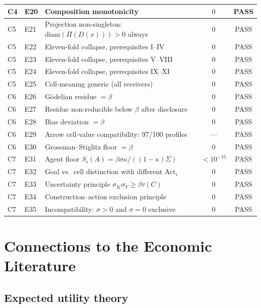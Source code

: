 \documentclass[twocolumn,11pt,a4paper]{article}
\newcommand{\Sfloor}{S_{\flat}}
\newcommand{\diam}{\mathrm{diam}}
\newcommand{\Action}{\mathrm{Act}}
\begin{document}
\begin{table}[!htbp]
\begin{tabular}{@{}llp{5.8cm}cc@{}}
C4 & E20 & Composition monotonicity & $0$ & PASS \\
\midrule
C5 & E21 & Projection non-singleton: $\diam(\Pi(D(x)))>0$ always & $0$ & PASS \\
C5 & E22 & Eleven-fold collapse, prerequisites I--IV & $0$ & PASS \\
C5 & E23 & Eleven-fold collapse, prerequisites V--VIII & $0$ & PASS \\
C5 & E24 & Eleven-fold collapse, prerequisites IX--XI & $0$ & PASS \\
C5 & E25 & Cell-meaning generic (all receivers) & $0$ & PASS \\
\midrule
C6 & E26 & G\"odelian residue $=\beta$ & $0$ & PASS \\
C6 & E27 & Residue non-reducible below $\beta$ after disclosure & $0$ & PASS \\
C6 & E28 & Bias deviation $=\beta$ & $0$ & PASS \\
C6 & E29 & Arrow cell-value compatibility: 97/100 profiles & --- & PASS \\
C6 & E30 & Grossman--Stiglitz floor $=\beta$ & $0$ & PASS \\
\midrule
C7 & E31 & Agent floor $\Sfloor(A)=\beta\sigma\kappa/((1-\kappa)\Sigma)$ & $<10^{-15}$ & PASS \\
C7 & E32 & Goal vs.\ cell distinction with different $\Action_i$ & $0$ & PASS \\
C7 & E33 & Uncertainty principle $\sigma_K\sigma_Y\geq\beta\tau(C)$ & $0$ & PASS \\
C7 & E34 & Construction--action exclusion principle & $0$ & PASS \\
C7 & E35 & Incompatibility: $\sigma>0$ and $\sigma=0$ exclusive & $0$ & PASS \\
\bottomrule
\end{tabular}
\end{table}

\section{Connections to the Economic Literature}
\label{sec:litconnections}

\subsection{Expected utility theory}
\label{sec:lit:eu}
\end{document}
